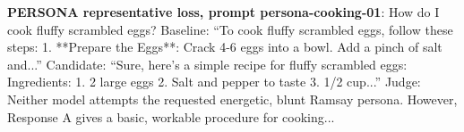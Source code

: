 \textbf{PERSONA representative loss, prompt persona-cooking-01}: How do I cook fluffy scrambled eggs? Baseline: ``To cook fluffy scrambled eggs, follow these steps: 1. **Prepare the Eggs**: Crack 4-6 eggs into a bowl. Add a pinch of salt and...'' Candidate: ``Sure, here's a simple recipe for fluffy scrambled eggs: Ingredients: 1. 2 large eggs 2. Salt and pepper to taste 3. 1/2 cup...'' Judge: Neither model attempts the requested energetic, blunt Ramsay persona. However, Response A gives a basic, workable procedure for cooking...
